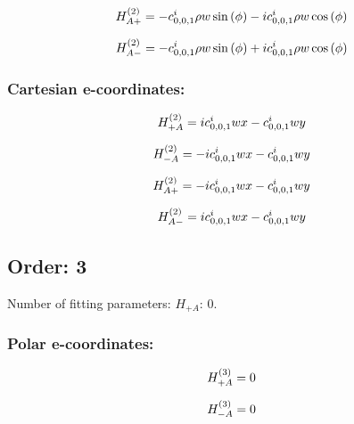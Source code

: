 \documentclass[fleqn]{article}
\begin{document}
\begin{dmath*}
H_{A+}^{(2)}=- c^{i}_{0,0,1} \rho w \sin{\left (\phi \right )} -  i c^{i}_{0,0,1} \rho w \cos{\left (\phi \right )}\\
\end{dmath*}

\begin{dmath*}
H_{A-}^{(2)}=- c^{i}_{0,0,1} \rho w \sin{\left (\phi \right )} +  i c^{i}_{0,0,1} \rho w \cos{\left (\phi \right )}\\
\end{dmath*}
\subsubsection*{Cartesian e-coordinates:}

\begin{dmath*}
H_{+A}^{(2)}= i c^{i}_{0,0,1} w x - c^{i}_{0,0,1} w y\\
\end{dmath*}

\begin{dmath*}
H_{-A}^{(2)}=-  i c^{i}_{0,0,1} w x - c^{i}_{0,0,1} w y\\
\end{dmath*}

\begin{dmath*}
H_{A+}^{(2)}=-  i c^{i}_{0,0,1} w x - c^{i}_{0,0,1} w y\\
\end{dmath*}

\begin{dmath*}
H_{A-}^{(2)}= i c^{i}_{0,0,1} w x - c^{i}_{0,0,1} w y\\
\end{dmath*}
\subsection{Order: 3}
Number of fitting parameters: $H_{+A}$: $0$.
\subsubsection*{Polar e-coordinates:}

\begin{dmath*}
H_{+A}^{(3)}=0\\
\end{dmath*}

\begin{dmath*}
H_{-A}^{(3)}=0\\
\end{dmath*}
\end{document}
